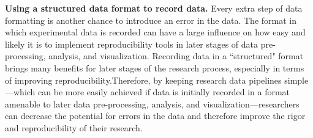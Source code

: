 \documentclass[pdftex,english,11pt,parskip=half]{scrartcl}
\begin{document}
\textbf{Using a structured data format to record data.} Every extra step of data
formatting is another chance to introduce an error in the data. The format in which experimental data is recorded can have a large influence on how easy and likely it is to implement reproducibility tools in later stages of data pre-processing, analysis, and visualization. Recording data in a ``structured" format brings many benefits for later stages of the research process, especially in terms of improving reproducibility.Therefore, by keeping research data pipelines simple---which can be more easily achieved if
data is initially recorded in a format amenable to later data pre-processing,
analysis, and visualization---researchers can decrease the potential for errors
in the data and therefore improve the rigor and reproducibility of their
research. 
\end{document}
